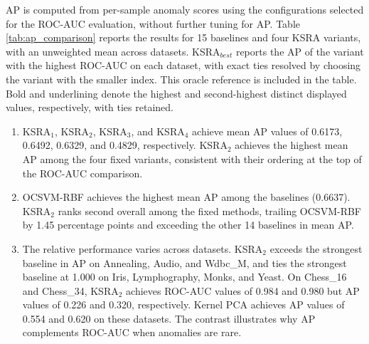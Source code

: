 \documentclass[ASNA,twocolumn]{USG} %
\begin{document}
AP is computed from per-sample anomaly scores using the configurations selected for the ROC-AUC evaluation, without further tuning for AP. Table \ref{tab:ap_comparison} reports the results for 15 baselines and four KSRA variants, with an unweighted mean across datasets. KSRA$_{best}$ reports the AP of the variant with the highest ROC-AUC on each dataset, with exact ties resolved by choosing the variant with the smaller index. This oracle reference is included in the table. Bold and underlining denote the highest and second-highest distinct displayed values, respectively, with ties retained.

\begin{enumerate}
    \item KSRA$_1$, KSRA$_2$, KSRA$_3$, and KSRA$_4$ achieve mean AP values of 0.6173, 0.6492, 0.6329, and 0.4829, respectively. KSRA$_2$ achieves the highest mean AP among the four fixed variants, consistent with their ordering at the top of the ROC-AUC comparison.

    \item OCSVM-RBF achieves the highest mean AP among the baselines (0.6637). KSRA$_2$ ranks second overall among the fixed methods, trailing OCSVM-RBF by 1.45 percentage points and exceeding the other 14 baselines in mean AP.
    
    \item The relative performance varies across datasets. KSRA$_2$ exceeds the strongest baseline in AP on Annealing, Audio, and Wdbc\_M, and ties the strongest baseline at 1.000 on Iris, Lymphography, Monks, and Yeast. On Chess\_16 and Chess\_34, KSRA$_2$ achieves ROC-AUC values of 0.984 and 0.980 but AP values of 0.226 and 0.320, respectively. Kernel PCA achieves AP values of 0.554 and 0.620 on these datasets. The contrast illustrates why AP complements ROC-AUC when anomalies are rare.
\end{enumerate}
\end{document}
